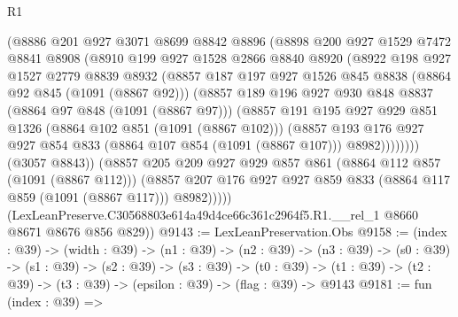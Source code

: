 \begin{lexlean}{R1}
\begin{coremodule}
              (@8886
                @201
                @927
                @3071
                @8699
                @8842
                @8896
                (@8898
                  @200
                  @927
                  @1529
                  @7472
                  @8841
                  @8908
                  (@8910
                    @199
                    @927
                    @1528
                    @2866
                    @8840
                    @8920
                    (@8922
                      @198
                      @927
                      @1527
                      @2779
                      @8839
                      @8932
                      (@8857
                        @187
                        @197
                        @927
                        @1526
                        @845
                        @8838
                        (@8864 @92 @845 (@1091 (@8867 @92)))
                        (@8857
                          @189
                          @196
                          @927
                          @930
                          @848
                          @8837
                          (@8864 @97 @848 (@1091 (@8867 @97)))
                          (@8857
                            @191
                            @195
                            @927
                            @929
                            @851
                            @1326
                            (@8864 @102 @851 (@1091 (@8867 @102)))
                            (@8857
                              @193
                              @176
                              @927
                              @927
                              @854
                              @833
                              (@8864 @107 @854 (@1091 (@8867 @107)))
                              @8982))))))))
              (@3057 @8843))
            (@8857
              @205
              @209
              @927
              @929
              @857
              @861
              (@8864 @112 @857 (@1091 (@8867 @112)))
              (@8857 @207 @176 @927 @927 @859 @833 (@8864 @117 @859 (@1091 (@8867 @117))) @8982)))))
      (LexLeanPreserve.C30568803e614a49d4ce66c361c2964f5.R1.__rel_1 @8660 @8671 @8676 @856 @829))
@9143 := LexLeanPreservation.Obs
@9158 := (index : @39) ->
  (width : @39) ->
  (n1 : @39) ->
  (n2 : @39) ->
  (n3 : @39) ->
  (s0 : @39) ->
  (s1 : @39) ->
  (s2 : @39) ->
  (s3 : @39) ->
  (t0 : @39) -> (t1 : @39) -> (t2 : @39) -> (t3 : @39) -> (epsilon : @39) -> (flag : @39) -> @9143
@9181 := fun (index : @39) =>

\end{coremodule}
\end{lexlean}

